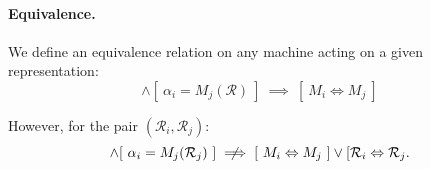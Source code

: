 \documentclass{article}
\numberwithin{equation}{section}
\begin{document}
\paragraph{Equivalence.} 
We define an equivalence relation on any machine acting on a given representation:
\begin{equation}
[ \ M_i(\mathcal{R}) = \alpha_i \ ] \land [ \ \alpha_i = M_j(\mathcal{R}) \ ] \ \implies \ [ \ M_i \Leftrightarrow M_j \ ]
\end{equation}

However, for the pair $(\mathcal{R}_i, \mathcal{R}_j)$:
\begin{equation}
[ \ M_i(\mathcal{R}_i) = \alpha_i \ ] \land [ \ \alpha_i = M_j(\mathcal{R}_j) \ ] \centernot\implies [ \ M_i \Leftrightarrow M_j \ ] \lor [ \mathcal{R}_i \Leftrightarrow \mathcal{R}_j.
\end{equation}
\end{document}
